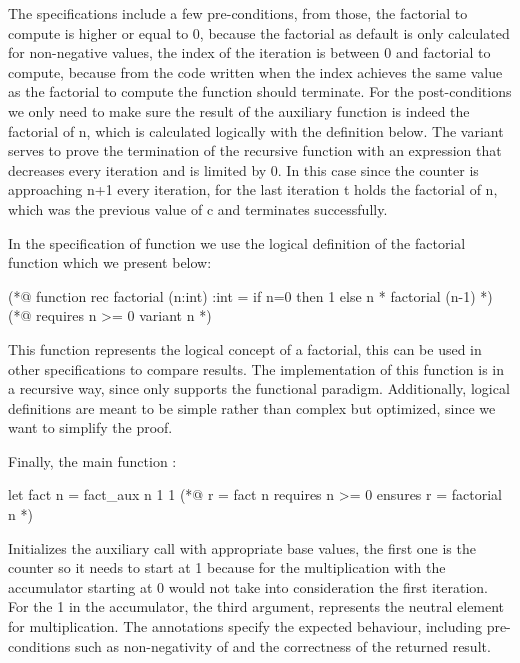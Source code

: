 The specifications include a few pre-conditions, from those, the factorial to compute is higher or equal to 0, because the factorial as 
default is only calculated for non-negative values, the index of the iteration is between 0 and factorial to compute, because from the
code written when the index achieves the same value as the factorial to compute the function should terminate. For the post-conditions
we only need to make sure the result of the auxiliary function is indeed the factorial of n, which is calculated logically with the 
definition below. The variant serves to prove the termination of the recursive function with an expression that decreases every iteration
and is limited by 0. In this case since the counter is approaching n+1 every iteration, for the last iteration t holds the factorial of n,
which was the previous value of c and terminates successfully.

In the specification of function  we use the logical definition of the factorial function which we present below:

\begin{gospell}
(*@ 
  function rec factorial (n:int) :int = 
    if n=0 then 1 else n * factorial (n-1)
*)
(*@ 
  requires n >= 0
  variant n
*)
\end{gospell}

This \gospel function represents the logical concept of a factorial, this can be used in other specifications 
to compare results. The implementation of this function is in a recursive way, since \gospel only supports the functional paradigm.
Additionally, logical definitions are meant to be simple rather than complex but optimized, since we want to simplify the proof.

Finally, the main function :

\begin{gospell}
let fact n = fact_aux n 1 1
(*@ 
  r = fact n
  requires n >= 0 
  ensures r = factorial n
*)
\end{gospell}

Initializes the auxiliary call with appropriate base values, the first one is the counter so it needs to start at 1 because for the 
multiplication with the accumulator starting at 0 would not take into consideration the first iteration. For the 1 in the accumulator, 
the third argument, represents the neutral element for multiplication. The \gospel annotations specify the expected behaviour, including 
pre-conditions such as non-negativity of  and the correctness of the returned result.

